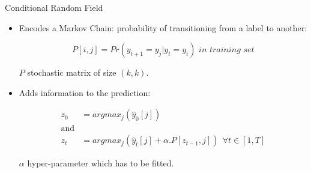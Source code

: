 \documentclass[final]{beamer}
\newlength{\onecolwid}
\newlength{\twocolwid}
\begin{document}
\begin{frame}[t]
\begin{columns}[t]
\begin{column}{\twocolwid}
\begin{columns}[t,totalwidth=\twocolwid]
\begin{column}{\onecolwid}
\begin{block}{Conditional Random Field}
\begin{itemize}
  \item Encodes a Markov Chain: probability of transitioning from a label to another:

  \vspace{5mm}

  \[
  P[i, j] = Pr(y_{t+1} = y_j | y_{t} =y_i) \textit{ in training set}
  \]

  \vspace{5mm}

  $P$ stochastic matrix of size $(k,k)$.

  \vspace{10mm}

  \item Adds information to the prediction:

  \vspace{5mm}

  \begin{align*}
  z_0 &= argmax_j(\hat{y}_0[j])
  \\
  \text{and}&
  \\
  z_t &= argmax_j(\hat{y}_t[j] + \alpha.P[z_{t-1},  j]) \ \ \forall t \in [1, T]
  \end{align*}

  \vspace{5mm}

  $\alpha$ hyper-parameter which has to be fitted.

  \end{itemize}

\end{block}


\end{column} %

\end{columns} %


%
%


\end{column}
\end{columns}
\end{frame}
\end{document}
